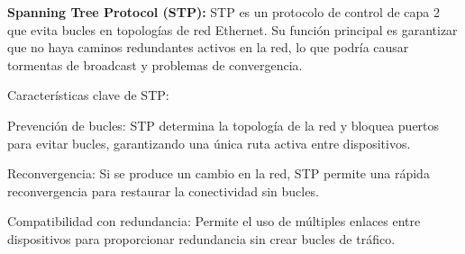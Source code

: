 \documentclass[a4paper]{article}
\begin{document}
\begin{enumerate}
\textbf{Spanning Tree Protocol (STP):}
STP es un protocolo de control de capa 2 que evita bucles en topologías de red Ethernet. Su función principal es garantizar que no haya caminos redundantes activos en la red, lo que podría causar tormentas de broadcast y problemas de convergencia.

Características clave de STP:

Prevención de bucles: STP determina la topología de la red y bloquea puertos para evitar bucles, garantizando una única ruta activa entre dispositivos.

Reconvergencia: Si se produce un cambio en la red, STP permite una rápida reconvergencia para restaurar la conectividad sin bucles.

Compatibilidad con redundancia: Permite el uso de múltiples enlaces entre dispositivos para proporcionar redundancia sin crear bucles de tráfico.
\end{enumerate}
\end{document}

